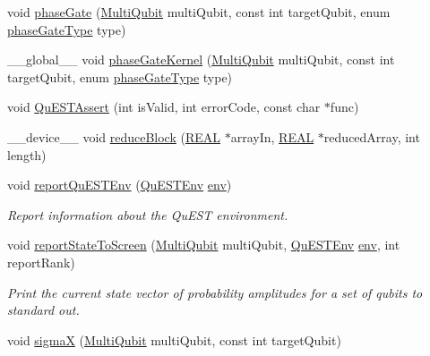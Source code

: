 \begin{DoxyCompactItemize}
\item 
void \mbox{\hyperlink{QuEST__env__localGPU_8cu_aae7a8a7f1ccbddb7f76b6c52b746bb43}{phase\+Gate}} (\mbox{\hyperlink{structMultiQubit}{Multi\+Qubit}} multi\+Qubit, const int target\+Qubit, enum \mbox{\hyperlink{QuEST_8h_a5739021c733cecc49647956b2f7338ea}{phase\+Gate\+Type}} type)
\item 
\+\_\+\+\_\+global\+\_\+\+\_\+ void \mbox{\hyperlink{QuEST__env__localGPU_8cu_aaf4f43971c469524f45d3bbc6d5f1167}{phase\+Gate\+Kernel}} (\mbox{\hyperlink{structMultiQubit}{Multi\+Qubit}} multi\+Qubit, const int target\+Qubit, enum \mbox{\hyperlink{QuEST_8h_a5739021c733cecc49647956b2f7338ea}{phase\+Gate\+Type}} type)
\item 
void \mbox{\hyperlink{QuEST__env__localGPU_8cu_a3587b9d533e633ccf1abf9ad2ce45d8d}{Qu\+E\+S\+T\+Assert}} (int is\+Valid, int error\+Code, const char $\ast$func)
\item 
\+\_\+\+\_\+device\+\_\+\+\_\+ void \mbox{\hyperlink{QuEST__env__localGPU_8cu_a4c740fa3ae25c71c1736790c674bdc98}{reduce\+Block}} (\mbox{\hyperlink{QuEST__precision_8h_a4b654506f18b8bfd61ad2a29a7e38c25}{R\+E\+AL}} $\ast$array\+In, \mbox{\hyperlink{QuEST__precision_8h_a4b654506f18b8bfd61ad2a29a7e38c25}{R\+E\+AL}} $\ast$reduced\+Array, int length)
\item 
void \mbox{\hyperlink{QuEST__env__localGPU_8cu_af8a14ae79c3fb2c0b5f6255cc37bebf9}{report\+Qu\+E\+S\+T\+Env}} (\mbox{\hyperlink{structQuESTEnv}{Qu\+E\+S\+T\+Env}} \mbox{\hyperlink{runTests_8c_a5fd8ba97fcae3408ae6221dfc3cc1f93}{env}})
\begin{DoxyCompactList}\small\item\em Report information about the Qu\+E\+ST environment. \end{DoxyCompactList}\item 
void \mbox{\hyperlink{QuEST__env__localGPU_8cu_a842d6884e063a5865a2232cba56b65ac}{report\+State\+To\+Screen}} (\mbox{\hyperlink{structMultiQubit}{Multi\+Qubit}} multi\+Qubit, \mbox{\hyperlink{structQuESTEnv}{Qu\+E\+S\+T\+Env}} \mbox{\hyperlink{runTests_8c_a5fd8ba97fcae3408ae6221dfc3cc1f93}{env}}, int report\+Rank)
\begin{DoxyCompactList}\small\item\em Print the current state vector of probability amplitudes for a set of qubits to standard out. \end{DoxyCompactList}\item 
void \mbox{\hyperlink{QuEST__env__localGPU_8cu_a86e396e06b7d527cac20ba0108872423}{sigmaX}} (\mbox{\hyperlink{structMultiQubit}{Multi\+Qubit}} multi\+Qubit, const int target\+Qubit)

\end{DoxyCompactItemize}
